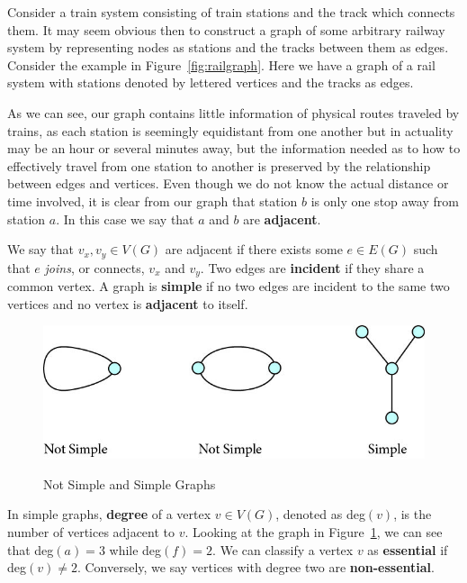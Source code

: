 Consider a train system consisting of train stations and the track which connects them. It may seem obvious then to construct a graph of some arbitrary railway system by representing nodes as stations and the tracks between them as edges. Consider the example in Figure~\ref{fig:railgraph}. Here we have a graph of a rail system with stations denoted by lettered vertices and the tracks as edges.

As we can see, our graph contains little information of physical routes traveled by trains, as each station is seemingly equidistant from one another but in actuality may be an hour or several minutes away, but the information needed as to how to effectively travel from one station to another is preserved by the relationship between edges and vertices. Even though we do not know the actual distance or time involved, it is clear from our graph that station $b$ is only one stop away from station $a$. In this case we say that $a$ and $b$ are \textbf{adjacent}.

\begin{defn}
We say that $v_x,v_y\in V(G)$ are adjacent if there exists some $e\in E(G)$ such that $e$ \textit{joins}, or connects, $v_x$ and $v_y$. Two edges are \textbf{incident} if they share a common vertex. A graph is \textbf{simple} if no two edges are incident to the same two vertices and no vertex is \textbf{adjacent} to itself.\cite{ed}
\end{defn}

\begin{figure}[h]
\centering
\caption{Not Simple and Simple Graphs}
\includegraphics[scale=.5]{simples.jpg}
\label{fig:simple}
\end{figure}

In simple graphs, \textbf{degree} of a vertex $v\in V(G)$, denoted as deg$(v)$, is the number of vertices adjacent to $v$. Looking at the graph in Figure~\ref{fig:simple}, we can see that deg$(a)=3$ while deg$(f)=2$. We can classify a vertex $v$ as \textbf{essential} if deg$(v)\neq 2$. Conversely, we say vertices with degree two are \textbf{non-essential}\cite{ed}.

